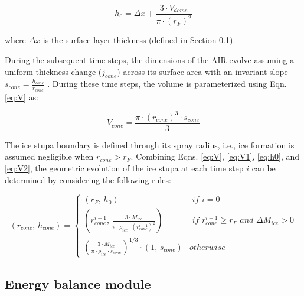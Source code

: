 \begin{equation}
	h_{0} =  \Delta x + \frac{3 \cdot V_{dome}}{\pi \cdot (r_F)^2 }
	\label{eq:h0}
\end{equation}

where $\Delta x$ is the surface layer thickness (defined in Section \ref{sec:energy}).

During the subsequent time steps, the dimensions of the \ac{AIR} evolve assuming a uniform thickness change ($j_{cone}$)
across its surface area with an invariant slope $s_{cone} = \frac{h_{cone}}{r_{cone}}$ .  During these time
steps, the volume is parameterized using Eqn. \ref{eq:V} as:

\begin{equation} 
  V_{cone} = \frac{\pi \cdot {(r_{cone})}^3 \cdot s_{cone}}{3} 
\label{eq:V2} 
\end{equation}

The ice stupa boundary is defined through its spray radius, i.e., ice formation is assumed negligible when
$r_{cone} > r_{F}$. Combining Eqns. \ref{eq:V},  \ref{eq:V1}, \ref{eq:h0}, and \ref{eq:V2}, the geometric
evolution of the ice stupa at each time step $i$ can be determined by considering the following rules:

\begin{equation} (r_{cone},\, h_{cone}) = \left\{ \begin{array}{ll} (r_F ,\, h_0)                                                                          & \textit{ if } i=0 \\
             (r_{cone}^{i-1},\, \frac{3 \cdot M_{ice}}{\pi \cdot \rho_{ice} \cdot {(r_{cone}^{i-1})}^2}) & \textit{ if }
             r_{cone}^{i-1} \geq r_{F} \textit{ and } \Delta M_{ice} > 0                                                     \\ (\frac{3 \cdot M_{ice}}{\pi \cdot \rho_{ice} \cdot s_{cone}})^{1/3} \cdot (1,\,  s_{cone}) &
             otherwise\end{array} \right.  \label{eq:A2} \end{equation}

\subsection{Energy balance module} \label{sec:energy}

